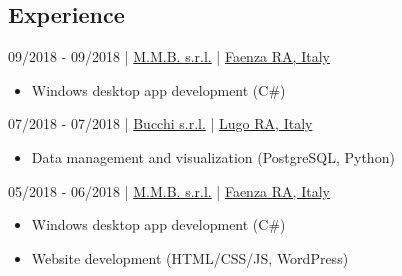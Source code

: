 \documentclass{article}
\begin{document}
\begin{paracol}{2}
%
%

\vfill

\section*{ Experience}

\begin{tcolorbox}[title=\emoji{man-technologist} Software Developer PCTO (work/school),colback=white]
     09/2018 - 09/2018 \hfill | \hfill
    \href{https://www.mmbsoftware.it/portalemmb/en/home}{ M.M.B. s.r.l.} \hfill | \hfill
    \href{https://www.openstreetmap.org/node/1864397767}{ Faenza RA, Italy}

    \tcblower

    \begin{itemize}
        \item {} Windows desktop app development (C\#)
    \end{itemize}
\end{tcolorbox}

\begin{tcolorbox}[title=\emoji{man-technologist} Software Developer Internship,colback=white]
     07/2018 - 07/2018 \hfill | \hfill
    \href{http://www.bucchi.it/en/}{ Bucchi s.r.l.} \hfill | \hfill
    \href{https://www.openstreetmap.org/node/4752486846}{ Lugo RA, Italy}

    \tcblower

    \begin{itemize}
        \item {} Data management and visualization (PostgreSQL, Python)
    \end{itemize}
\end{tcolorbox}

\begin{tcolorbox}[title=\emoji{man-technologist} Software Developer PCTO (work/school),colback=white]
     05/2018 - 06/2018 \hfill | \hfill
    \href{https://www.mmbsoftware.it/portalemmb/en/home}{ M.M.B. s.r.l.} \hfill | \hfill
    \href{https://www.openstreetmap.org/node/1864397767}{ Faenza RA, Italy}

    \tcblower

    \begin{itemize}
        \item {} Windows desktop app development (C\#)
        \item {} Website development (HTML/CSS/JS, WordPress)
    \end{itemize}
\end{tcolorbox}


\end{paracol}
\end{document}
